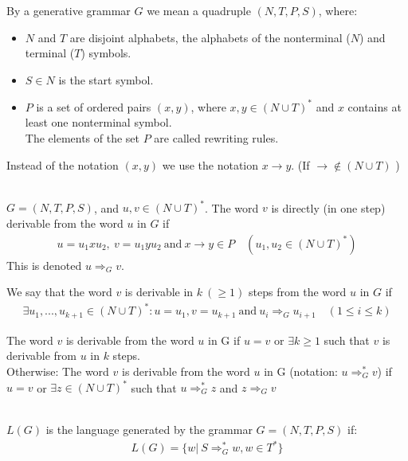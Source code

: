 \documentclass[margin=0px]{article}
\begin{document}
\begin{description}
        By a generative grammar $G$ we mean a quadruple $(N,T,P,S)$, where:
        \begin{itemize}
            \item $N$ and $T$ are disjoint alphabets, the alphabets of the nonterminal ($N$) and terminal ($T$) symbols.
            \item $S\in N$ is the start symbol.
            \item $P$ is a set of ordered pairs $(x,y)$, where $x,y \in (N \cup T)^*$ and $x$ contains at least one nonterminal symbol. \\
                  The elements of the set $P$ are called rewriting rules.
        \end{itemize}
        Instead of the notation $(x,y)$ we use the notation $x \rightarrow y$. (If $\rightarrow \notin (N\cup T)$ )
    \item[Derivation] \hfill \\
        $ G = (N,T,P,S) $, and $u,v \in (N\cup T)^*$. The word $v$ is directly (in one step) derivable from the word $u$ in $G$ if
        \begin{align*}
            u = u_1xu_2, \ v = u_1yu_2 \ \textrm{and} \ x \rightarrow y \in P \quad (u_1, u_2 \in (N \cup T)^*)
        \end{align*}
        This is denoted $ u \Longrightarrow_G v$.

        We say that the word $v$ is derivable in $k \ (\geq 1)$ steps from the word $u$ in $G$ if
        \begin{align*}
            \exists u_1, ... , u_{k+1} \in (N\cup T)^*: u = u_1, v = u_{k+1} \ \textrm{and} \ u_i \Longrightarrow_G u_{i+1} \quad (1 \leq i \leq k)
        \end{align*}

        The word $v$ is derivable from the word $u$ in G if $u=v$ or $\exists k \geq 1$ such that $v$ is derivable from $u$ in $k$ steps.\\
        Otherwise: The word $v$ is derivable from the word $u$ in G (notation: $ u \Longrightarrow_G^* v $) if $u=v$ or $\exists z \in  (N\cup T)^*$ such that $ u \Longrightarrow_G^* z $ and $ z \Longrightarrow_G v $
    \item[Generated language] \hfill \\
        $L(G)$ is the language generated by the grammar $G=(N,T,P,S)$ if:
        \begin{align*}
            L(G) = \{w | \ S \Longrightarrow_G^* w, w \in T^*\}
        \end{align*}
\end{description}
\end{document}

